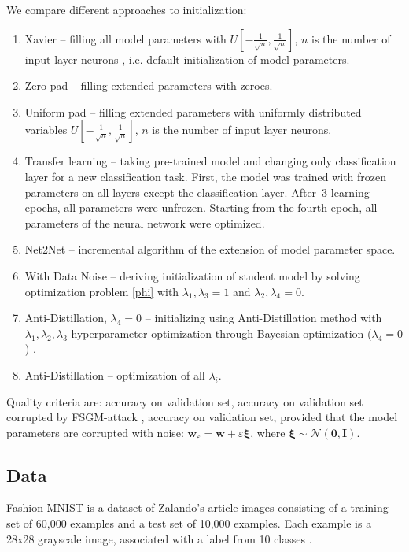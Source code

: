 \documentclass[conference]{IEEEtran}
\begin{document}
We compare different approaches to initialization:
\begin{enumerate}
    \item Xavier -- filling all model parameters with $U[-\frac1{\sqrt{n}}, \frac1{\sqrt{n}}]$, $n$ is the number of input layer  neurons \cite{glorot2010understanding}, i.e. default initialization of model parameters.
    \item Zero pad -- filling extended parameters with zeroes.
    \item Uniform pad -- filling extended parameters with uniformly distributed variables $U[-\frac1{\sqrt{n}}, \frac1{\sqrt{n}}]$, $n$ is the number of input layer neurons.
    \item Transfer learning -- taking pre-trained model and changing only classification layer for a new classification task. First, the model was trained with frozen parameters on all layers except the classification layer. After~$3$ learning epochs, all parameters were unfrozen. Starting from the fourth epoch, all parameters of the neural network were optimized.
    \item Net2Net -- incremental algorithm of the extension of model parameter space\cite{net2net}.
    \item With Data Noise -- deriving initialization of student model by solving optimization problem \ref{phi} with $\lambda_1, \lambda_3 = 1$ and $\lambda_2, \lambda_4 = 0$.
    \item Anti-Distillation, $\lambda_4 = 0$ -- initializing using Anti-Distillation method with $\lambda_1, \lambda_2, \lambda_3$ hyperparameter optimization through Bayesian optimization ($\lambda_4 = 0$) \cite{akiba2019optuna}.
    \item Anti-Distillation -- optimization of all $\lambda_i$.
\end{enumerate}

Quality criteria are: accuracy on validation set, accuracy on validation set corrupted by FSGM-attack \cite{goodfellow2014explaining}, accuracy on validation set, provided that the model parameters are corrupted with noise: ${\mathbf{w}_\varepsilon} = \mathbf{w} + \varepsilon \boldsymbol{\xi}$, where $\boldsymbol{\xi} \sim \mathcal{N} (\mathbf{0}, \mathbf{I})$.


\subsection{Data}


Fashion-MNIST is a dataset of Zalando's article images consisting of a training set of 60,000 examples and a test set of 10,000 examples. Each example is a 28x28 grayscale image, associated with a label from 10 classes  \cite{fashionmnist}.
\end{document}
